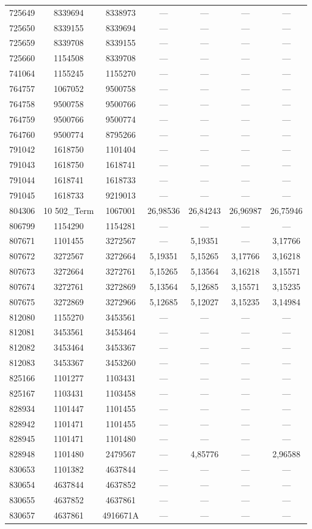 \begin{longtable}{lcccccc}
725649 & 8339694 & 8338973 & --- & --- & --- & --- \\
725650 & 8339155 & 8339694 & --- & --- & --- & --- \\
725659 & 8339708 & 8339155 & --- & --- & --- & --- \\
725660 & 1154508 & 8339708 & --- & --- & --- & --- \\
741064 & 1155245 & 1155270 & --- & --- & --- & --- \\
764757 & 1067052 & 9500758 & --- & --- & --- & --- \\
764758 & 9500758 & 9500766 & --- & --- & --- & --- \\
764759 & 9500766 & 9500774 & --- & --- & --- & --- \\
764760 & 9500774 & 8795266 & --- & --- & --- & --- \\
791042 & 1618750 & 1101404 & --- & --- & --- & --- \\
791043 & 1618750 & 1618741 & --- & --- & --- & --- \\
791044 & 1618741 & 1618733 & --- & --- & --- & --- \\
791045 & 1618733 & 9219013 & --- & --- & --- & --- \\
804306 & 10 502\_Term & 1067001 & 26,98536 & 26,84243 & 26,96987 & 26,75946 \\
806799 & 1154290 & 1154281 & --- & --- & --- & --- \\
807671 & 1101455 & 3272567 & --- & 5,19351 & --- & 3,17766 \\
807672 & 3272567 & 3272664 & 5,19351 & 5,15265 & 3,17766 & 3,16218 \\
807673 & 3272664 & 3272761 & 5,15265 & 5,13564 & 3,16218 & 3,15571 \\
807674 & 3272761 & 3272869 & 5,13564 & 5,12685 & 3,15571 & 3,15235 \\
807675 & 3272869 & 3272966 & 5,12685 & 5,12027 & 3,15235 & 3,14984 \\
812080 & 1155270 & 3453561 & --- & --- & --- & --- \\
812081 & 3453561 & 3453464 & --- & --- & --- & --- \\
812082 & 3453464 & 3453367 & --- & --- & --- & --- \\
812083 & 3453367 & 3453260 & --- & --- & --- & --- \\
825166 & 1101277 & 1103431 & --- & --- & --- & --- \\
825167 & 1103431 & 1103458 & --- & --- & --- & --- \\
828934 & 1101447 & 1101455 & --- & --- & --- & --- \\
828942 & 1101471 & 1101455 & --- & --- & --- & --- \\
828945 & 1101471 & 1101480 & --- & --- & --- & --- \\
828948 & 1101480 & 2479567 & --- & 4,85776 & --- & 2,96588 \\
830653 & 1101382 & 4637844 & --- & --- & --- & --- \\
830654 & 4637844 & 4637852 & --- & --- & --- & --- \\
830655 & 4637852 & 4637861 & --- & --- & --- & --- \\
830657 & 4637861 & 4916671A & --- & --- & --- & --- \\
\end{longtable}
\endgroup
